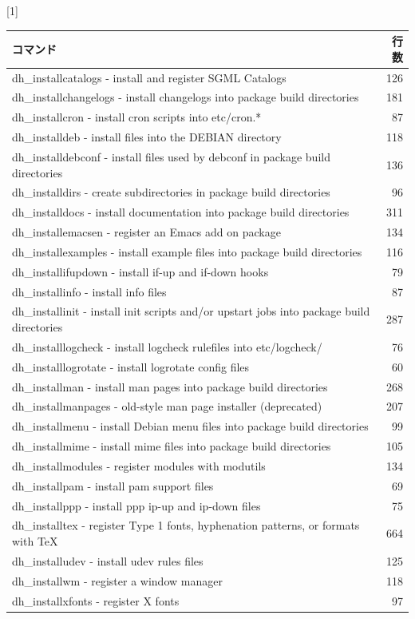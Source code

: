 \documentclass[mingoth,a4paper]{jsarticle}
\begin{document}
\begin{table}[htb]
\scalebox{1}[1]{
\begin{tabular}{|l|r|} \hline
コマンド & 行数 \\ \hline
dh\_installcatalogs - install and register SGML Catalogs & 126 \\ \hline
dh\_installchangelogs - install changelogs into package build directories & 181 \\ \hline
dh\_installcron - install cron scripts into etc/cron.* & 87 \\ \hline
dh\_installdeb - install files into the DEBIAN directory & 118 \\ \hline
dh\_installdebconf - install files used by debconf in package build directories & 136 \\ \hline
dh\_installdirs - create subdirectories in package build directories & 96 \\ \hline
dh\_installdocs - install documentation into package build directories & 311 \\ \hline
dh\_installemacsen - register an Emacs add on package & 134 \\ \hline
dh\_installexamples - install example files into package build directories & 116 \\ \hline
dh\_installifupdown - install if-up and if-down hooks & 79 \\ \hline
dh\_installinfo - install info files & 87 \\ \hline
dh\_installinit - install init scripts and/or upstart jobs into package build directories & 287 \\ \hline
dh\_installlogcheck - install logcheck rulefiles into etc/logcheck/ & 76 \\ \hline
dh\_installlogrotate - install logrotate config files & 60 \\ \hline
dh\_installman - install man pages into package build directories & 268 \\ \hline
dh\_installmanpages - old-style man page installer (deprecated) & 207 \\ \hline
dh\_installmenu - install Debian menu files into package build directories & 99 \\ \hline
dh\_installmime - install mime files into package build directories & 105 \\ \hline
dh\_installmodules - register modules with modutils & 134 \\ \hline
dh\_installpam - install pam support files & 69 \\ \hline
dh\_installppp - install ppp ip-up and ip-down files & 75 \\ \hline
dh\_installtex - register Type 1 fonts, hyphenation patterns, or formats with TeX & 664 \\ \hline
dh\_installudev - install udev rules files & 125 \\ \hline
dh\_installwm - register a window manager & 118 \\ \hline
dh\_installxfonts - register X fonts & 97 \\ \hline
\end{tabular}
}
\end{table}
\end{document}
